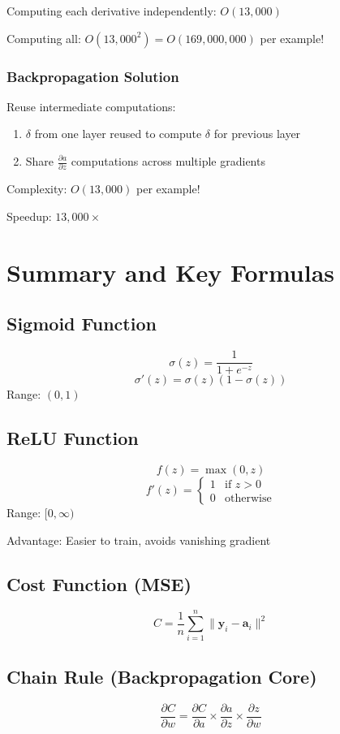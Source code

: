 \documentclass[11pt,a4paper]{article}
\begin{document}
Computing each derivative independently: $O(13,000)$

Computing all: $O(13,000^2) = O(169,000,000)$ per example!

\subsubsection{Backpropagation Solution}
Reuse intermediate computations:
\begin{enumerate}
    \item $\delta$ from one layer reused to compute $\delta$ for previous layer
    \item Share $\frac{\partial a}{\partial z}$ computations across multiple gradients
\end{enumerate}

Complexity: $O(13,000)$ per example!

Speedup: $13,000\times$

\newpage

\section{Summary and Key Formulas}

\subsection{Sigmoid Function}
\[
\sigma(z) = \frac{1}{1 + e^{-z}}
\]
\[
\sigma'(z) = \sigma(z)(1 - \sigma(z))
\]
Range: $(0, 1)$

\subsection{ReLU Function}
\[
f(z) = \max(0, z)
\]
\[
f'(z) = \begin{cases} 1 & \text{if } z > 0 \\ 0 & \text{otherwise} \end{cases}
\]
Range: $[0, \infty)$

Advantage: Easier to train, avoids vanishing gradient

\subsection{Cost Function (MSE)}
\[
C = \frac{1}{n} \sum_{i=1}^{n} \|\mathbf{y}_i - \mathbf{a}_i\|^2
\]

\subsection{Chain Rule (Backpropagation Core)}
\[
\frac{\partial C}{\partial w} = \frac{\partial C}{\partial a} \times \frac{\partial a}{\partial z} \times \frac{\partial z}{\partial w}
\]
\end{document}
